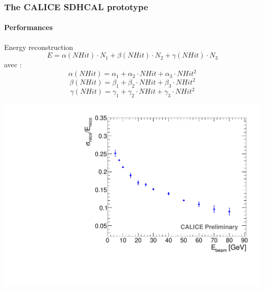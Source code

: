 \documentclass[8pt]{beamer}
\begin{document}
  
  \begin{frame}
  \frametitle{The CALICE SDHCAL prototype}
  \framesubtitle{Performances}
    \begin{minipage}{0.48\linewidth}
      \begin{block}{Energy reconstruction}
        {\small
        \begin{equation}
          E = \alpha(NHit)\cdot N_1 + \beta(NHit)\cdot N_2 + \gamma(NHit)\cdot N_3 
        \end{equation}
        avec :
        \begin{equation}
          \alpha(NHit) = \alpha_1 + \alpha_2\cdot NHit + \alpha_3\cdot NHit^2
        \end{equation}
        \begin{equation}
          \beta(NHit) = \beta_1 + \beta_2\cdot NHit + \beta_3\cdot NHit^2
        \end{equation}
        \begin{equation}
          \gamma(NHit) = \gamma_1 + \gamma_2\cdot NHit + \gamma_3\cdot NHit^2
        \end{equation}
        }
      \end{block}
      \includegraphics[width=\linewidth]{Energy-Resolution.pdf}
    \end{minipage} \hfill
    \begin{minipage}{0.5\linewidth}
      \begin{center}

\end{center}
\end{minipage}
\end{frame}
\end{document}

